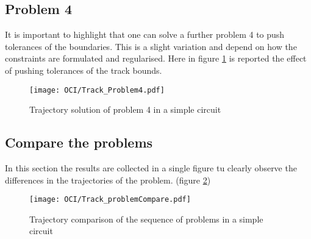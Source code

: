 \subsection{Problem 4}
%
It is important to highlight that one can solve a further problem 4 to push tolerances of the boundaries. This is a slight variation and depend on how the constraints are formulated and regularised. Here in figure \ref{fig:Problem4} is reported the effect of pushing tolerances of the track bounds.
%
\begin{figure}[h!]
    \centering
    \texttt{[image: OCI/Track\_Problem4.pdf]}
    \caption{Trajectory solution of problem 4 in a simple circuit}
    \label{fig:Problem4}
\end{figure}
%
\subsection{Compare the problems}
%
In this section the results are collected in a single figure tu clearly observe the differences in the trajectories of the problem. (figure \ref{fig:ProblemCompare})
%
\begin{figure}[h!]
    \centering
    \texttt{[image: OCI/Track\_problemCompare.pdf]}
    \caption{Trajectory comparison of the sequence of problems in a simple circuit}
    \label{fig:ProblemCompare}
\end{figure}
%